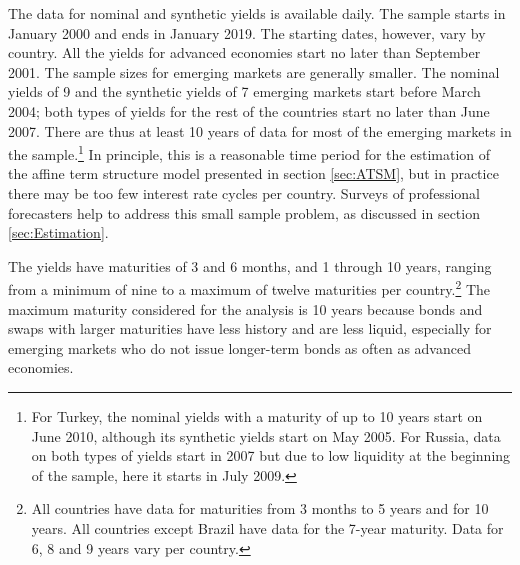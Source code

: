 {The data for nominal and synthetic yields is available daily. 
The sample starts in January 2000 and ends in January 2019. The starting dates, however,
vary by country.
All the yields for advanced economies start no later than September 2001.
The sample sizes for emerging markets are generally smaller.
The nominal yields of 9 and the synthetic yields of 7 emerging markets start before March 2004; both types of yields for the rest of the countries start no later than June 2007.
There are thus at least 10 years of data for most of the emerging markets in the sample.\footnote{ For Turkey, the nominal yields with a maturity of up to 10 years start on June 2010, although its synthetic yields start on May 2005. For Russia, data on both types of yields start in 2007 but due to low liquidity at the beginning of the sample, here it starts in July 2009.}
In principle, this is a reasonable time period for the estimation of the affine term structure model presented in section \ref{sec:ATSM}, but in practice there may be too few interest rate cycles per country.
Surveys of professional forecasters help to address this small sample problem, as discussed in section \ref{sec:Estimation}. 

The yields have maturities of 3 and 6 months, and 1 through 10 years, ranging from a minimum of nine to a maximum of twelve maturities per country.\footnote{ All countries have data for maturities from 3 months to 5 years and for 10 years. All countries except Brazil have data for the 7-year maturity. Data for 6, 8 and 9 years vary per country.} 
The maximum maturity considered for the analysis is 10 years because bonds and swaps with larger maturities %
have less history and %
are less liquid, especially for emerging markets who do not issue longer-term bonds as often as advanced economies.
%	

}
